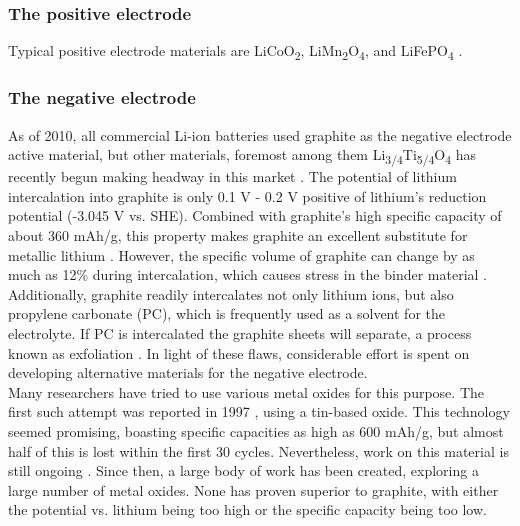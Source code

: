 \documentclass[12pt]{article} %
\begin{document}
\subsubsection{The positive electrode} %

Typical positive electrode materials are LiCoO\textsubscript{2}, LiMn\textsubscript{2}O\textsubscript{4}, and LiFePO\textsubscript{4} \cite{kulova_new_2013}.


\subsubsection{The negative electrode} %

As of 2010, all commercial Li-ion batteries used graphite as the negative electrode active material, but other materials, foremost among them Li\textsubscript{3/4}Ti\textsubscript{5/4}O\textsubscript{4} has recently begun making headway in this market \cite{kulova_new_2013}.
The potential of lithium intercalation into graphite is only 0.1 V - 0.2 V positive of lithium's reduction potential (-3.045 V vs. SHE).
Combined with graphite's high specific capacity of about 360 mAh/g, this property makes graphite an excellent substitute for metallic lithium \cite{reddy_thomas_figure_2011} \cite{reddy_thomas_figure_2011-1}.
However, the specific volume of graphite can change by as much as 12\% during intercalation, which causes stress in the binder material \cite{kulova_new_2013}.
Additionally, graphite readily intercalates not only lithium ions, but also propylene carbonate (PC), which is frequently used as a solvent for the electrolyte.
If PC is intercalated the graphite sheets will separate, a process known as exfoliation \cite{reddy_thomas_section_2011-2}.
In light of these flaws, considerable effort is spent on developing alternative materials for the negative electrode.
\\
Many researchers have tried to use various metal oxides for this purpose.
The first such attempt was reported in 1997 \cite{idota_tin-based_1997}, using a tin-based oxide.
This technology seemed promising, boasting specific capacities as high as 600 mAh/g, but almost half of this is lost within the first 30 cycles.
Nevertheless, work on this material is still ongoing \cite{kulova_new_2013}.
Since then, a large body of work has been created, exploring a large number of metal oxides.
None has proven superior to graphite, with either the potential vs. lithium being too high or the specific capacity being too low.
\end{document}
